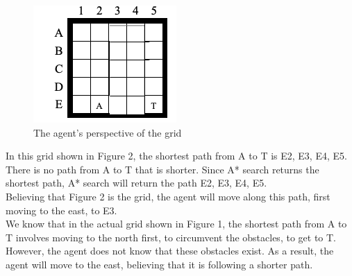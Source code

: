 \documentclass{article}
\begin{document}
\begin{figure}[h!]
  \includegraphics[]{p1_1.png}
  \caption{The agent's perspective of the grid }
\end{figure}

In this grid shown in Figure 2, the shortest path from  A to T is E2, E3, E4, E5. There is no path from A to T that is shorter. Since A* search returns the shortest path, A* search will return the path E2, E3, E4, E5.\\

Believing that Figure 2 is the grid, the agent will move along this path, first moving to the east, to E3. \\

We know that in the actual grid shown in Figure 1, the shortest path from A to T involves moving to the north first, to circumvent the obstacles, to get to T. However, the agent does not know that these obstacles exist. As a result, the agent will move to the east, believing that it is following a shorter path. \\
\end{document}
